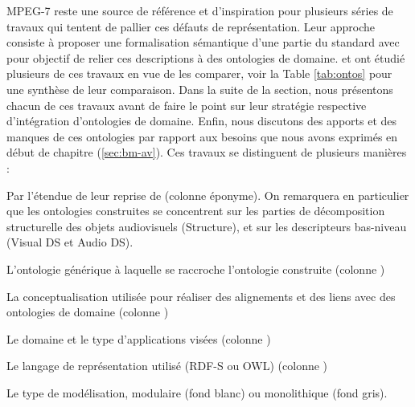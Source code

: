 MPEG-7 reste une source de référence et d'inspiration pour plusieurs séries de travaux qui tentent de pallier ces défauts de représentation.
Leur approche consiste à proposer une formalisation sémantique d'une partie du standard avec pour objectif de relier ces descriptions à des ontologies de domaine.
\cite{Troncy2007} et \cite{Dasiopoulou2009} ont étudié plusieurs de ces travaux en vue de les comparer, voir la Table \ref{tab:ontos} pour une synthèse de leur comparaison. 
Dans la suite de la section, nous présentons chacun de ces travaux avant de faire le point sur leur stratégie respective d'intégration d'ontologies de domaine.
Enfin, nous discutons des apports et des manques de ces ontologies par rapport aux besoins que nous avons exprimés en début de chapitre (\ref{sec:bm-av}).
Ces travaux se distinguent de plusieurs manières : 
\begin{liste}
	\item Par l'étendue de leur reprise de  (colonne éponyme).
	On remarquera en particulier que les ontologies construites se concentrent sur les parties de décomposition structurelle des objets audiovisuels (Structure), et sur les descripteurs bas-niveau (Visual DS et Audio DS).
	\item L'ontologie générique à laquelle se raccroche l'ontologie construite (colonne ) 
	\item La conceptualisation utilisée pour réaliser des alignements et des liens avec des ontologies de domaine (colonne ) 
	\item Le domaine et le type d'applications visées (colonne ) 
	\item Le langage de représentation utilisé (RDF-S ou OWL) (colonne ) 
	\item Le type de modélisation, modulaire (fond blanc) ou monolithique (fond gris).
\end{liste}

